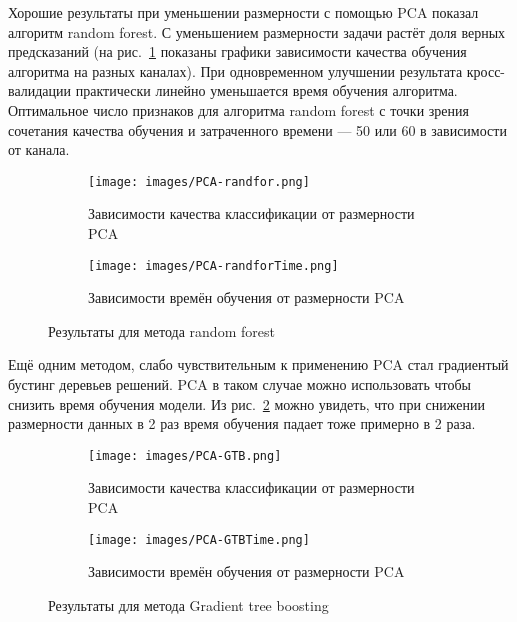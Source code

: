 \par
Хорошие результаты при уменьшении размерности с помощью PCA показал алгоритм random forest. С уменьшением размерности задачи растёт доля верных предсказаний (на рис.~\ref{fig:randfor_pca} показаны графики зависимости качества обучения алгоритма на разных каналах). При одновременном улучшении результата кросс-валидации практически линейно уменьшается время обучения алгоритма. Оптимальное число признаков для алгоритма random forest с точки зрения сочетания качества обучения и затраченного времени --- 50 или 60 в зависимости от канала.
 
\begin{figure}[h!]
    \centering
	\begin{subfigure}{0.45\textwidth}
		\texttt{[image: images/PCA-randfor.png]}
		\caption{Зависимости качества классификации от размерности PCA}
	\end{subfigure}
	\begin{subfigure}{0.45\textwidth}
		\texttt{[image: images/PCA-randforTime.png]}
		\caption{Зависимости времён обучения от размерности PCA}
	\end{subfigure}
	\caption{Результаты для метода random forest}\label{fig:randfor_pca}
\end{figure} 
 
\par
Ещё одним методом, слабо чувствительным к применению PCA стал градиентый бустинг деревьев решений. PCA в таком случае можно использовать чтобы снизить время обучения модели. Из рис.~\ref{fig:gtb_pca} можно увидеть, что при снижении размерности данных в 2 раз время обучения падает тоже примерно в 2 раза.

\begin{figure}[h!]
    \centering
	\begin{subfigure}{0.45\textwidth}
		\texttt{[image: images/PCA-GTB.png]}
		\caption{Зависимости качества классификации от размерности PCA}
	\end{subfigure}
	\begin{subfigure}{0.45\textwidth}
		\texttt{[image: images/PCA-GTBTime.png]}
		\caption{Зависимости времён обучения от размерности PCA}
	\end{subfigure}
	\caption{Результаты для метода Gradient tree boosting}\label{fig:gtb_pca}
\end{figure}

\par
